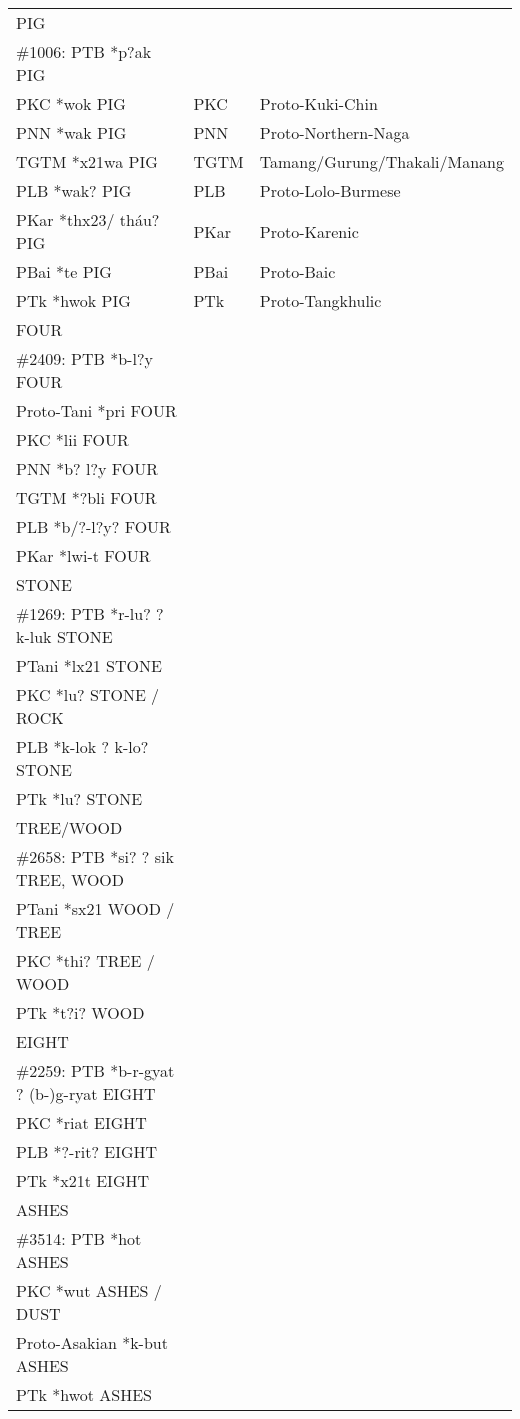 \begin{tabular}{l l l}
PIG   \\
\#1006: PTB *p?ak PIG  \\
PKC *wok PIG & PKC & Proto-Kuki-Chin \\
PNN *wak PIG  & PNN & Proto-Northern-Naga\\
TGTM *x21wa PIG  & TGTM & Tamang/Gurung/Thakali/Manang\\
PLB *wak? PIG  & PLB & Proto-Lolo-Burmese\\
PKar *thx23/ tháu?  PIG & PKar & Proto-Karenic\\
PBai *te PIG  & PBai & Proto-Baic\\
PTk *hwok PIG &   PTk & Proto-Tangkhulic\\

FOUR \\
\#2409: PTB *b-l?y FOUR \\
Proto-Tani *pri FOUR \\
PKC *lii FOUR \\
PNN *b? l?y FOUR \\
TGTM *?bli FOUR \\
PLB *b/?-l?y? FOUR \\
PKar *lwi-t FOUR \\

STONE \\
\#1269: PTB *r-lu? ? k-luk STONE \\
PTani *lx21 STONE \\
PKC *lu? STONE / ROCK \\
PLB *k-lok ? k-lo? STONE \\
PTk *lu? STONE \\

TREE/WOOD \\
\#2658: PTB *si? ? sik TREE, WOOD \\
PTani *sx21 WOOD / TREE \\
PKC *thi? TREE / WOOD \\
PTk *t?i? WOOD \\

EIGHT \\
\#2259: PTB *b-r-gyat ? (b-)g-ryat EIGHT \\
PKC *riat EIGHT \\
PLB *?-rit? EIGHT \\
PTk *x21t EIGHT \\

ASHES \\
\#3514: PTB *hot ASHES \\
PKC *wut ASHES / DUST \\
Proto-Asakian *k-but ASHES	 \\
PTk *hwot ASHES \\
\end{tabular}

